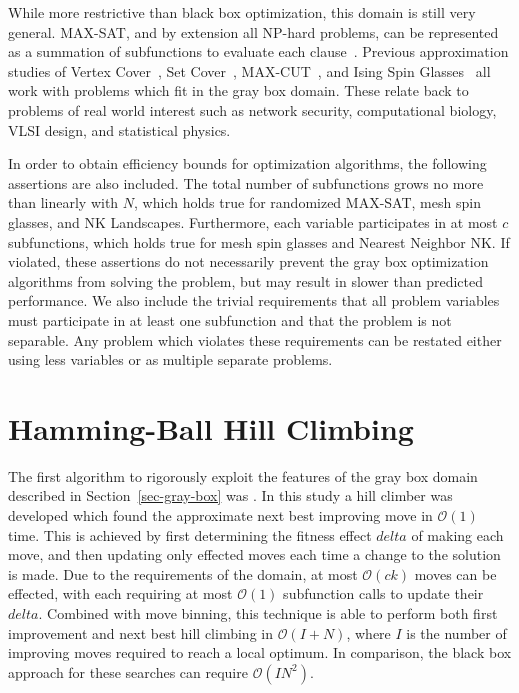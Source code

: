 \documentclass{sig-alternate}
\newcommand{\BigO}[1]{$\mathcal{O}{(#1)}$}
\begin{document}
While more restrictive than black box optimization, this domain is still very general.
MAX-SAT, and by extension all NP-hard problems, can be represented
as a summation of subfunctions to evaluate each clause~\cite{whitley:2013:greedy}.
Previous approximation studies of Vertex Cover~\cite{oliveto:2009:vertexcover},
Set Cover~\cite{yu:2010:setcover}, MAX-CUT~\cite{festa:2002:maxcut}, and
Ising Spin Glasses~\cite{pelikan:2003:hboaising} all work with problems which fit
in the gray box domain. These relate back to problems of real world interest such
as network security, computational biology, VLSI design, and statistical physics.

In order to obtain efficiency bounds for optimization algorithms, the following
assertions are also included. The total number of subfunctions grows no more than
linearly with $N$, which holds true for randomized MAX-SAT, mesh spin glasses, and NK Landscapes.
Furthermore, each variable participates in at most $c$ subfunctions, which holds true
for mesh spin glasses and Nearest Neighbor NK. If violated, these assertions do not
necessarily prevent the gray box optimization algorithms from solving the problem, but may result
in slower than predicted performance.
We also include the trivial requirements that all problem variables must participate
in at least one subfunction and that the problem is not separable. Any problem which
violates these requirements can be restated either using less variables or as multiple separate problems.

\section{Hamming-Ball Hill Climbing}
\label{sec-hamming}
The first algorithm to rigorously exploit the features of the gray box domain
described in Section~\ref{sec-gray-box} was \cite{whitley:2013:greedy}. In this study
a hill climber was developed which found the approximate next best improving move in \BigO{1} time.
This is achieved by first determining the fitness effect $delta$ of making each move, and then updating
only effected moves each time a change to the solution is made. Due to the requirements of the domain,
at most \BigO{ck} moves can be effected, with each requiring at most \BigO{1} subfunction calls
to update their $delta$. Combined with move binning, this technique is able to perform both
first improvement and next best hill climbing in \BigO{I+N}, where $I$ is the number of improving
moves required to reach a local optimum. In comparison, the black box approach for these searches can require
\BigO{IN^2}.
\end{document}
